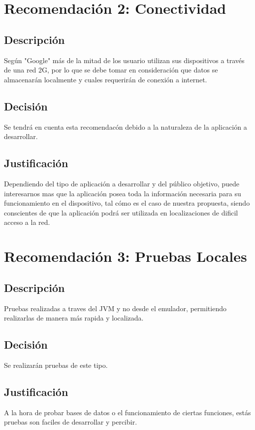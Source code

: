 \documentclass{article}
\begin{document}
    \section{Recomendación 2: Conectividad}
        \subsection{Descripción}
        Según "Google" más de la mitad de los usuario utilizan sus dispositivos a través de una
         red 2G, por lo que se debe tomar en consideración que datos se almacenarán localmente y
         cuales requerirán de conexión a internet.

        \subsection{Decisión}
        Se tendrá en cuenta esta recomendacón debido a la naturaleza de la aplicación a desarrollar.

        \subsection{Justificación}
        Dependiendo del tipo de aplicación a desarrollar y del público objetivo, puede interesarnos
         mas que la aplicación posea toda la información necesaria para su funcionamiento en el dispositivo,
         tal cómo es el caso de nuestra propuesta, siendo conscientes de que la aplicación podrá ser utilizada
         en localizaciones de dificil acceso a la red.

    \section{Recomendación 3: Pruebas Locales}
        \subsection{Descripción}
        Pruebas realizadas a traves del JVM y no desde el emulador, permitiendo realizarlas de manera más
         rapida y localizada.

        \subsection{Decisión}
        Se realizarán pruebas de este tipo.

        \subsection{Justificación}
        A la hora de probar bases de datos o el funcionamiento de ciertas funciones, estás pruebas son
         faciles de desarrollar y percibir.
\end{document}
